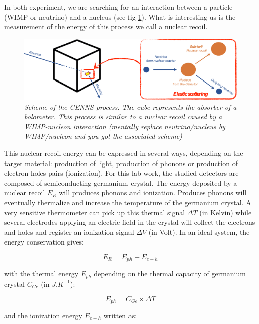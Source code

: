 In both experiment, we are searching for an interaction between a particle (WIMP or neutrino) and a nucleus (see fig \ref{cenns-process}). What is interesting us is the measurement of the energy of this process we call a nuclear recoil. 

\begin{figure}
\centering
\captionsetup{justification=centering}
\includegraphics[width=\textwidth]{Figures/Experiment/cenns_process.pdf}
\caption{\label{cenns-process} \em Scheme of the CENNS process. The cube represents the absorber of a bolometer. This process is similar to a nuclear recoil caused by a WIMP-nucleon interaction (mentally replace neutrino/nucleus by WIMP/nucleon and you got the associated scheme)}
\end{figure}

This nuclear recoil energy can be expressed in several ways, depending on the target material: production of light, production of phonons or production of electron-holes pairs (ionization). For this lab work, the studied detectors are composed of semiconducting germanium crystal. The energy deposited by a nuclear recoil $E_R$ will produces phonons and ionization. Produces phonons will eventually thermalize and increase the temperature of the germanium crystal. A very sensitive thermometer can pick up this thermal signal $\Delta T$ (in Kelvin) while several electrodes applying an electric field in the crystal will collect the electrons and holes and register an ionization signal $\Delta V$ (in Volt). In an ideal system, the energy conservation gives:

\begin{equation}
\label{energy}
E_R = E_{ph} + E_{e-h}
\end{equation}

with the thermal energy $E_{ph}$ depending on the thermal capacity of germanium crystal $C_{Ge}$ (in $J.K^{-1}$):

\begin{equation}
E_{ph} = C_{Ge} \times \Delta T
\end{equation}

and the ionization energy $E_{e-h}$ written as:

